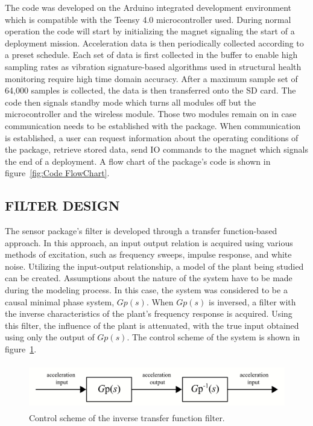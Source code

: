 \documentclass[]{spie}  %
\begin{document}
	The code was developed on the Arduino integrated development environment which is compatible with the Teensy 4.0 microcontroller used. During normal operation the code will start by initializing the magnet signaling the start of a deployment mission. Acceleration data is then periodically collected according to a preset schedule. Each set of data is first collected in the buffer to enable high sampling rates as vibration signature-based algorithms used in structural health monitoring require high time domain accuracy. After a maximum sample set of 64,000 samples is collected, the data is then transferred onto the SD card. The code then signals standby mode which turns all modules off but the microcontroller and the wireless module. Those two modules remain on in case communication needs to be established with the package. When communication is established, a user can request information about the operating conditions of the package, retrieve stored data, send IO commands to the magnet which signals the end of a deployment. A flow chart of the package’s code is shown in figure~\ref{fig:Code FlowChart}.
	
	\subsection{FILTER DESIGN}


	The sensor package's filter is developed through a transfer function-based approach. In this approach, an input output relation is acquired using various methods of excitation, such as frequency sweeps, impulse response, and white noise. Utilizing the input-output relationship, a model of the plant being studied can be created. Assumptions about the nature of the system have to be made during the modeling process. In this case, the system was considered to be a causal minimal phase system, $Gp(s)$. When $Gp(s)$ is inversed, a filter with the inverse characteristics of the plant’s frequency response is acquired. Using this filter, the influence of the plant is attenuated, with the true input obtained using only the output of $Gp(s)$. The control scheme of the system is shown in figure~\ref{fig:Control_Scheme}.
	
	\begin{figure} [H]
		\centering
		\includegraphics[height=2cm]{figures/Control Scheme.png}
		\caption{Control scheme of the inverse transfer function filter.}
		\label{fig:Control_Scheme}
	\end{figure} 
\end{document}
